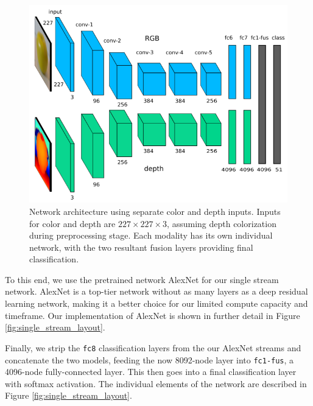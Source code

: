 \begin{figure}
	\centering
	\includegraphics[width=0.85\linewidth]{img/architecture.png} 
	\caption{Network architecture using separate color and depth inputs. Inputs for color and depth are $227 \times 227 \times 3$, assuming depth colorization during preprocessing stage. Each modality has its own individual network, with the two resultant fusion layers providing final classification.}
	\label{fig:network}
\end{figure}

To this end, we use the pretrained network AlexNet for our single stream network. AlexNet is a top-tier network without as many layers as a deep residual learning network, making it a better choice for our limited compute capacity and timeframe. Our implementation of AlexNet is shown in further detail in Figure \ref{fig:single_stream_layout}. 

Finally, we strip the \texttt{fc8} classification layers from the our AlexNet streams and concatenate the two models, feeding the now 8092-node layer into \texttt{fc1-fus}, a 4096-node fully-connected layer. This then goes into a final classification layer with softmax activation. The individual elements of the network are described in Figure \ref{fig:single_stream_layout}.

